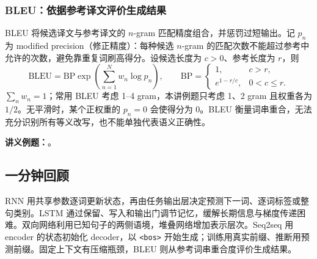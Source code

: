 \subsubsection{BLEU：依据参考译文评价生成结果}

BLEU 将候选译文与参考译文的 $n$-gram 匹配精度组合，并惩罚过短输出。记 $p_n$ 为 modified precision（修正精度）：每种候选 $n$-gram 的匹配次数不能超过参考中允许的次数，避免靠重复词刷高得分。设候选长度为 $c>0$、参考长度为 $r$，则
\[
 \mathrm{BLEU}=\mathrm{BP}\exp\!\left(\sum_{n=1}^{N}w_n\log p_n\right),
 \qquad
 \mathrm{BP}=\begin{cases}1,&c>r,\\e^{1-r/c},&0<c\leq r.\end{cases}
\]
$\sum_nw_n=1$；常用 BLEU 考虑 1--4 gram，本讲例题只考虑 1、2 gram 且权重各为 $1/2$。无平滑时，某个正权重的 $p_n=0$ 会使得分为 0。BLEU 衡量词串重合，无法充分识别所有等义改写，也不能单独代表语义正确性。

\textbf{讲义例题：}。

\subsection{一分钟回顾}

RNN 用共享参数逐词更新状态，再由任务输出层决定预测下一词、逐词标签或整句类别。LSTM 通过保留、写入和输出门调节记忆，缓解长期信息与梯度传递困难。双向网络利用已知句子的两侧语境，堆叠网络增加表示层次。Seq2seq 用 encoder 的状态初始化 decoder，以 \texttt{<bos>} 开始生成；训练用真实前缀、推断用预测前缀。固定上下文有压缩瓶颈，BLEU 则从参考词串重合度评价生成结果。
\endgroup
